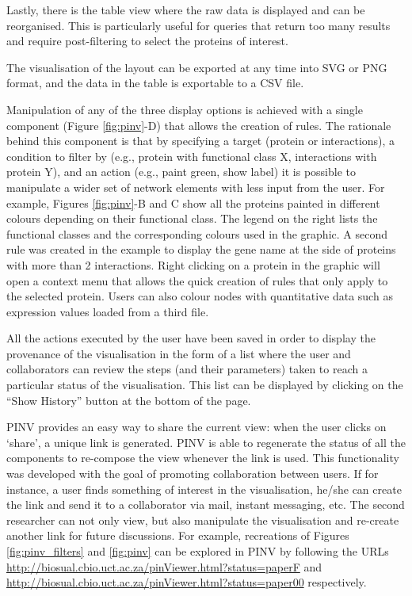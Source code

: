 Lastly, there is the table view where the raw data is displayed and can be reorganised. This is particularly useful for queries that return too many results and require post-filtering to select the proteins of interest.

The visualisation of the layout can be exported at any time into SVG or PNG format, and the data in the table is exportable to a CSV file.

Manipulation of any of the three display options is achieved with a single component (Figure \ref{fig:pinv}-D) that allows the creation of rules. The rationale behind this component is that by specifying a target (protein or interactions), a condition to filter by (e.g., protein with functional class X, interactions with protein Y), and an action (e.g., paint green, show label) it is possible to manipulate a wider set of network elements with less input from the user. For example, Figures \ref{fig:pinv}-B and C show all the proteins painted in different colours depending on their functional class. The legend on the right lists the functional classes and the corresponding colours used in the graphic. A second rule was created in the example to display the gene name at the side of proteins with more than 2 interactions.
Right clicking on a protein in the graphic will open a context menu that allows the quick creation of rules that only apply to the selected protein. Users can also colour nodes with quantitative data such as expression values loaded from a third file.

All the actions executed by the user have been saved in order to display the provenance of the visualisation in the form of a list where the user and collaborators can review the steps (and their parameters) taken to reach a particular status of the visualisation. This list can be displayed by clicking on the “Show History” button at the bottom of the page. 

PINV provides an easy way to share the current view: when the user clicks on `share', a unique link is generated. PINV is able to regenerate the status of all the components to re-compose the view whenever the link is used. 
This functionality was developed with the goal of promoting collaboration between users. If for instance, a user finds something of interest in the visualisation, he/she can create the link and send it to a collaborator via mail, instant messaging, etc. The second researcher can not only view, but also manipulate the visualisation and re-create another link for future discussions. For example, recreations of Figures \ref{fig:pinv_filters} and \ref{fig:pinv} can be explored in PINV by following the URLs \url{http://biosual.cbio.uct.ac.za/pinViewer.html?status=paperF} and \url{http://biosual.cbio.uct.ac.za/pinViewer.html?status=paper00} respectively.

